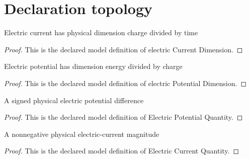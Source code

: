 \section{Declaration topology}
\begin{definition}
  \label{def:physics:phyx-mini-0642:phyxminiproblems-problemphyxmini0642-electriccurrentdimension}
  Electric current has physical dimension charge divided by time
\end{definition}
\begin{proof}
  This is the declared model definition of electric Current Dimension.
\end{proof}
\begin{definition}
  \label{def:physics:phyx-mini-0642:phyxminiproblems-problemphyxmini0642-electricpotentialdimension}
  Electric potential has dimension energy divided by charge
\end{definition}
\begin{proof}
  This is the declared model definition of electric Potential Dimension.
\end{proof}
\begin{definition}
  \label{def:physics:phyx-mini-0642:phyxminiproblems-problemphyxmini0642-electricpotentialquantity}
  A signed physical electric potential difference
\end{definition}
\begin{proof}
  This is the declared model definition of Electric Potential Quantity.
\end{proof}
\begin{definition}
  \label{def:physics:phyx-mini-0642:phyxminiproblems-problemphyxmini0642-electriccurrentquantity}
  A nonnegative physical electric-current magnitude
\end{definition}
\begin{proof}
  This is the declared model definition of Electric Current Quantity.
\end{proof}
